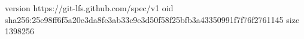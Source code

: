 version https://git-lfs.github.com/spec/v1
oid sha256:25e98ff6f5a20e3da8fe3ab33c9e3d50f58f25bfb3a43350991f7f76f2761145
size 1398256
